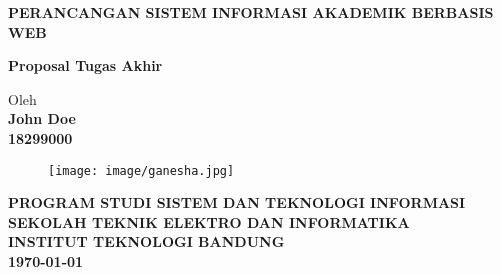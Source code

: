 \documentclass[12pt,a4paper,oneside]{book}
\begin{document}
\begin{titlepage}
\begin{center}

    
    \vspace*{2cm}
    
    {\Large\bfseries PERANCANGAN SISTEM INFORMASI AKADEMIK BERBASIS WEB}\\
     \vspace{4cm}

    {\Large \textbf{Proposal Tugas Akhir}}\\


    \vspace{2cm}
    
    
    {\large Oleh}\\[0.3cm]
    \textbf{
    {\large John Doe}\\
    {\large 18299000}
    }\\

    \vspace{2cm}
    
    \begin{figure}[h]
    \centering
    \texttt{[image: image/ganesha.jpg]}
    \end{figure}
    
    
    \vfill

    \textbf{
    {\large PROGRAM STUDI SISTEM DAN TEKNOLOGI INFORMASI}\\
    {\large SEKOLAH TEKNIK ELEKTRO DAN INFORMATIKA}\\
    {\large INSTITUT TEKNOLOGI BANDUNG}\\
    {\large {}\today}
    }
\end{center}
\end{titlepage}
\end{document}
